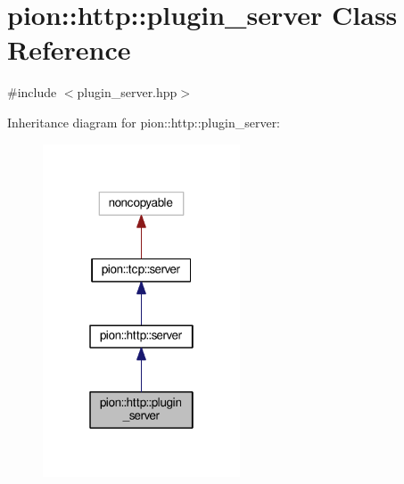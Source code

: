 \hypertarget{classpion_1_1http_1_1plugin__server}{\section{pion\-:\-:http\-:\-:plugin\-\_\-server Class Reference}
\label{classpion_1_1http_1_1plugin__server}
}


{\ttfamily \#include $<$plugin\-\_\-server.\-hpp$>$}



Inheritance diagram for pion\-:\-:http\-:\-:plugin\-\_\-server\-:
\nopagebreak
\begin{figure}[H]
\begin{center}
\leavevmode
\includegraphics[width=166pt]{classpion_1_1http_1_1plugin__server__inherit__graph}
\end{center}
\end{figure}


